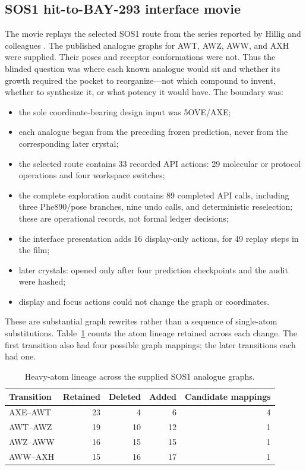 \subsection{SOS1 hit-to-BAY-293 interface movie}
\label{app:sos1-movie}

The movie replays the selected SOS1 route from the series reported by Hillig
and colleagues \cite{hillig2019bay293}. The published analogue graphs for AWT,
AWZ, AWW, and AXH were supplied. Their poses and receptor conformations were
not. Thus the blinded question was where each known analogue would sit and
whether its growth required the pocket to reorganize---not which compound to
invent, whether to synthesize it, or what potency it would have. The boundary
was:

\begin{itemize}
  \item the sole coordinate-bearing design input was 5OVE/AXE;
  \item each analogue began from the preceding frozen prediction, never from
    the corresponding later crystal;
  \item the selected route contains 33 recorded API actions: 29 molecular or
    protocol operations and four workspace switches;
  \item the complete exploration audit contains 89 completed API calls,
    including three Phe890/pose branches, nine undo calls, and deterministic
    reselection; these are operational records, not formal ledger decisions;
  \item the interface presentation adds 16 display-only actions, for 49 replay
    steps in the film;
  \item later crystals: opened only after four prediction checkpoints and the
    audit were hashed;
  \item display and focus actions could not change the graph or coordinates.
\end{itemize}

These are substantial graph rewrites rather than a sequence of single-atom
substitutions. Table~\ref{tab:sos1-graph-edits} counts the atom lineage retained
across each change. The first transition also had four possible graph mappings;
the later transitions each had one.

\begin{table}[htbp]
  \centering
  \caption{Heavy-atom lineage across the supplied SOS1 analogue graphs.}
  \label{tab:sos1-graph-edits}
  \footnotesize
  \begin{tabular}{@{}lrrrr@{}}
    \toprule
    Transition & Retained & Deleted & Added & Candidate mappings \\
    \midrule
    AXE--AWT & 23 & 4 & 6 & 4 \\
    AWT--AWZ & 19 & 10 & 12 & 1 \\
    AWZ--AWW & 16 & 15 & 15 & 1 \\
    AWW--AXH & 15 & 16 & 17 & 1 \\
    \bottomrule
  \end{tabular}
\end{table}

